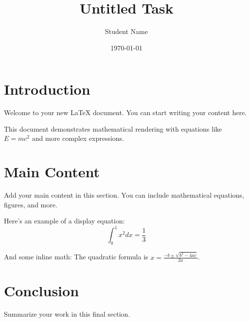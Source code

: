 \documentclass{article}
\title{Untitled Task}
\author{Student Name}
\date{\today}
\begin{document}
\maketitle

\section{Introduction}
Welcome to your new LaTeX document. You can start writing your content here.

This document demonstrates mathematical rendering with equations like $E = mc^2$ and more complex expressions.

\section{Main Content}
Add your main content in this section. You can include mathematical equations, figures, and more.

Here's an example of a display equation:
$$\int_0^1 x^2 dx = \frac{1}{3}$$

And some inline math: The quadratic formula is $x = \frac{-b \pm \sqrt{b^2-4ac}}{2a}$.

\section{Conclusion}
Summarize your work in this final section.
\end{document}
